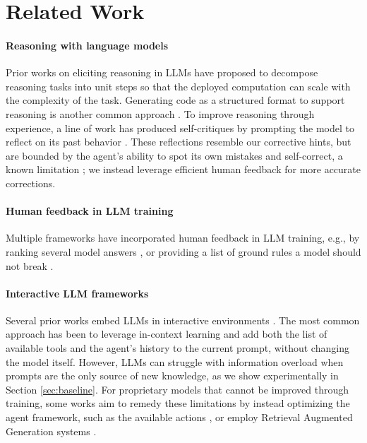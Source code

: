 \section{Related Work}
\label{sec:related_work}



\paragraph{Reasoning with language models}
Prior works on eliciting reasoning in LLMs have proposed to decompose reasoning tasks into unit steps \citep{nye2021show,wei2022chain,zhou2023least,yao2024tree,zhang2024examination,hernandez2024recursive} so that the deployed computation can scale with the complexity of the task. Generating code as a structured format to support reasoning is another common approach \citep{nye2021show,gao2023pal,wang2024executable}. To improve reasoning through experience, a line of work has produced self-critiques by prompting the model to reflect on its past behavior \citep{shinn2024reflexion}. These reflections resemble our corrective hints, but are bounded by the agent's ability to spot its own mistakes and self-correct, a known limitation \citep{huang2023large}; we instead leverage efficient human feedback for more accurate corrections.

\paragraph{Human feedback in LLM training} Multiple frameworks have incorporated human feedback in LLM training, e.g., by ranking several model answers \citep{ouyang2022training}, or providing a list of ground rules a model should not break \citep{bai2022constitutional}. 

\paragraph{Interactive LLM frameworks} Several prior works embed LLMs in interactive environments \citep{yao2023react,zhou2023language,shinn2024reflexion}. The most common approach has been to leverage in-context learning and add both the list of available tools and the agent's history to the current prompt, without changing the model itself.
However, LLMs can struggle with information overload when prompts are the only source of new knowledge, as we show experimentally in Section \ref{sec:baseline}. For proprietary models that cannot be improved through training, some works aim to remedy these limitations by instead optimizing the agent framework, such as the available actions \citep{zhangoffline,nguyen_dynasaur_2024}, or employ Retrieval Augmented Generation \citep{lewis2020retrieval} systems \citep{zhao2024expel}.

